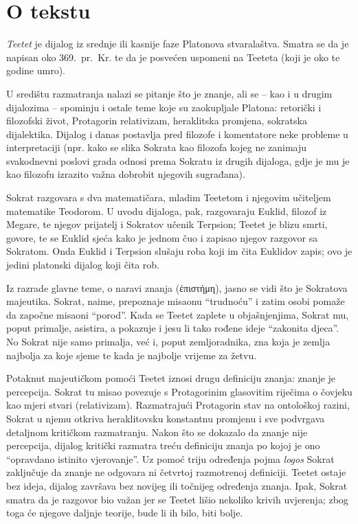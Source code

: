 


\section*{O tekstu}

\textit{Teetet} je dijalog iz srednje ili kasnije faze Platonova stvaralaštva. Smatra se da je napisan oko 369.\ pr.~Kr. te da je posvećen uspomeni na Teeteta (koji je oko te godine umro).
 
U središtu razmatranja nalazi se pitanje što je znanje, ali se – kao i u drugim dijalozima – spominju i ostale teme koje su zaokupljale Platona: retorički i filozofski život, Protagorin relativizam, heraklitska promjena, sokratska dijalektika. Dijalog i danas postavlja pred filozofe i komentatore neke probleme u interpretaciji (npr. kako se slika Sokrata kao filozofa kojeg ne zanimaju svakodnevni poslovi grada odnosi prema Sokratu iz drugih dijaloga, gdje je mu je kao filozofu izrazito važna dobrobit njegovih sugrađana). 

Sokrat razgovara s dva matematičara, mladim Teetetom i njegovim učiteljem matematike Teodorom. U uvodu dijaloga, pak, razgovaraju Euklid, filozof iz Megare, te njegov prijatelj i Sokratov učenik Terpsion; Teetet je blizu smrti, govore, te se Euklid sjeća kako je jednom čuo i zapisao njegov razgovor sa Sokratom. Onda Euklid i Terpsion slušaju roba koji im čita Euklidov zapis; ovo je jedini platonski dijalog koji čita rob.

Iz razrade glavne teme, o naravi znanja (ἐπιστήμη), jasno se vidi što je Sokratova majeutika. Sokrat, naime, prepoznaje misaonu ``trudnoću'' i zatim osobi pomaže da započne misaoni ``porod''. Kada se Teetet zaplete u objašnjenjima, Sokrat mu, poput primalje, asistira, a pokazuje i jesu li tako rođene ideje ``zakonita djeca''. No Sokrat nije samo primalja, već i, poput zemljoradnika, zna koja je zemlja najbolja za koje sjeme te kada je najbolje vrijeme za žetvu.

Potaknut majeutičkom pomoći Teetet iznosi drugu definiciju znanja: znanje je percepcija. Sokrat tu misao povezuje s Protagorinim glasovitim riječima o čovjeku kao mjeri stvari (relativizam). Razmatrajući Protagorin stav na ontološkoj razini, Sokrat u njemu otkriva heraklitovsku konstantnu promjenu i sve podvrgava detaljnom kritičkom razmatranju. Nakon što se dokazalo da znanje nije percepcija, dijalog kritički razmatra treću definiciju znanja po kojoj je ono ``opravdano istinito vjerovanje''. Uz pomoć triju određenja pojma \textit{logos} Sokrat zaključuje da znanje ne odgovara ni četvrtoj razmotrenoj definiciji. Teetet ostaje bez ideja, dijalog završava bez novijeg ili točnijeg određenja znanja. Ipak, Sokrat smatra da je razgovor bio važan jer se Teetet lišio nekoliko krivih uvjerenja; zbog toga će njegove daljnje teorije, bude li ih bilo, biti bolje.

